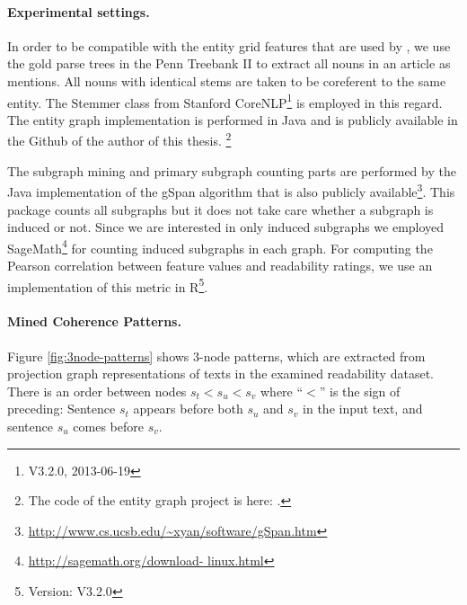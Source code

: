 \paragraph{Experimental settings.} 
In order to be compatible with the entity grid features that are used by , we use the gold parse trees in the Penn Treebank II \cite{marcus94} to extract all nouns in an article as mentions. 
All nouns with identical stems are taken to be coreferent to the same entity. 
The Stemmer class from Stanford CoreNLP\footnote{V3.2.0, 2013-06-19} is employed in this regard.  
The entity graph implementation is performed in Java and is publicly available in the Github of the author of this thesis.
\footnote{The code of the entity graph project is here: \url{}.} 

The subgraph mining and primary subgraph counting parts are performed by the Java implementation of the gSpan algorithm that is also publicly available\footnote{\url{http://www.cs.ucsb.edu/~xyan/software/gSpan.htm}}. 
This package counts all subgraphs but it does not take care whether a subgraph is induced or not. 
Since we are interested in only induced subgraphs we employed SageMath\footnote{\url{http://sagemath.org/download- linux.html}} for counting induced subgraphs in each graph.  
For computing the Pearson correlation between feature values and readability ratings, we use an implementation of this metric in R\footnote{Version: V3.2.0}. 

\paragraph{Mined Coherence Patterns.} 
Figure \ref{fig:3node-patterns} shows 3-node patterns, which are extracted from projection graph representations of texts in the examined readability dataset. 
There is an order between nodes $s_t < s_u < s_v$ where ``$<$'' is the sign of preceding: Sentence $s_t$ appears before both $s_u$ and $s_v$ in the input text, and sentence $s_u$ comes before $s_v$. 

